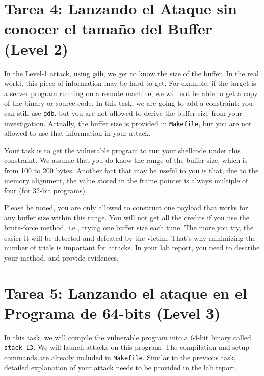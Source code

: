 \section{Tarea 4: Lanzando el Ataque sin conocer el tamaño del Buffer (Level 2)}

In the Level-1 attack, using \texttt{gdb}, we get to know 
the size of the buffer. In the real world, this piece of information
may be hard to get. For example, if the target is a server program
running on a remote machine, we will not be able to get a copy
of the binary or source code. In this task, we are going to add a 
constraint: you can still use \texttt{gdb}, but you are not allowed
to derive the buffer size from your investigation. Actually, the 
buffer size is provided in \texttt{Makefile}, but you are not allowed
to use that information in your attack.

Your task is to get the vulnerable program to run your shellcode 
under this constraint. We assume that you do know the range of the 
buffer size, which is from 100 to 200 bytes. Another fact that 
may be useful to you is that, due to the memory alignment,
the value stored in the 
frame pointer is always multiple of four (for 32-bit programs). 

Please be noted, you are only allowed
to construct one payload that works for any buffer size
within this range.  You will not get all the credits if you
use the brute-force method, i.e., trying one buffer size
each time. The more you try, the easier it will be detected
and defeated by the victim. That's why minimizing the number
of trials is important for attacks.
In your lab report, you need to describe your method,
and provide evidences. 



\section{Tarea 5: Lanzando el ataque en el Programa de 64-bits (Level 3)}

In this task, we will compile the vulnerable program 
into a 64-bit binary called \texttt{stack-L3}.  
We will launch attacks on this program. The compilation and setup
commands are already included in \texttt{Makefile}. Similar to
the previous task, detailed explanation of your attack needs to be provided 
in the lab report. 


